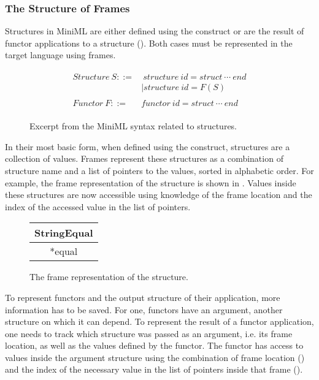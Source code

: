 \subsubsection{The Structure of Frames \label{sec:StructureOfFrames}}
Structures in MiniML are either defined using the  construct or are the result of functor applications to a structure ().
Both cases must be represented in the target language using frames.

\begin{figure}[htb]
\begin{align*}
\begin{aligned}
\mathit{Structure\ }S ::= &\ \mathit{structure\ } \mathit{id} = \mathit{struct\ }\cdots \mathit{\ end}\\
& |\mathit{structure\ } \mathit{id} = F(S)\\
\\
\mathit{Functor\ }F ::=&\mathit{functor\ } \mathit{id} = \mathit{struct\ }\cdots\mathit{\ end}
\end{aligned}
\end{align*}
\caption{Excerpt from the MiniML syntax related to structures\label{fig:FunctorGrammarExcerpt}.}
\end{figure}

In their most basic form, when defined using the  construct, structures are a collection of values.
Frames represent these structures as a combination of structure name and a list of pointers to the values, sorted in alphabetic order.
For example, the frame representation of the  structure is shown in .
Values inside these structures are now accessible using knowledge of the frame location and the index of the accessed value in the list of pointers.

\begin{figure}[H]
\centering
\begin{tabular}{|c|}
\hline
StringEqual \\
\hline
*equal \\
\hline
\end{tabular}
\caption{The frame representation of the  structure.\label{fig:StringEqualFrame}}
\end{figure}

To represent functors and the output structure of their application, more information has to be saved. 
For one, functors have an argument, another structure on which it can depend.
To represent the result of a functor application, one needs to track which structure was passed as an argument, i.e. its frame location, as well as the values defined by the functor.
The functor has access to values inside the argument structure using the combination of frame location () and the index of the necessary value in the list of pointers inside that frame ().

